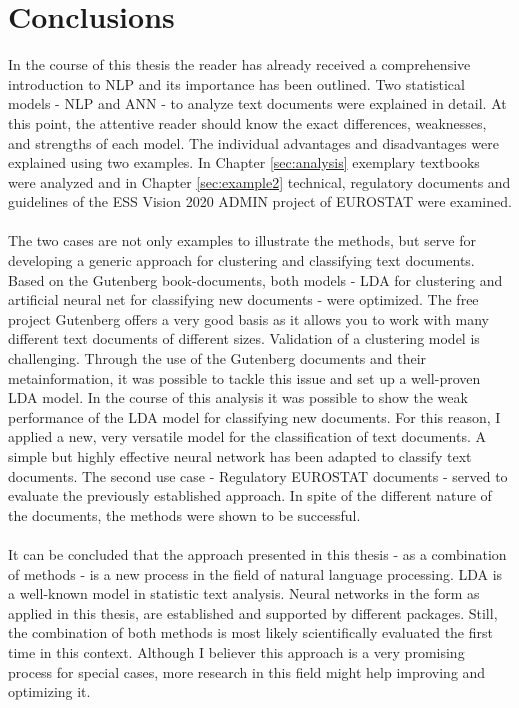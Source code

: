 \documentclass[11pt,a4paper]{article}
\begin{document}
\section{Conclusions} \label{sec:conclusions}

In the course of this thesis the reader has already received a comprehensive introduction to NLP and its importance has been outlined. Two statistical models - NLP and ANN - to analyze text documents were explained in detail. At this point, the attentive reader should know the exact differences, weaknesses, and strengths of each model. The individual advantages and disadvantages were explained using two examples. In Chapter \ref{sec:analysis} exemplary textbooks were analyzed and in Chapter \ref{sec:example2} technical, regulatory documents and guidelines of the ESS Vision 2020 ADMIN project of EUROSTAT were examined.\\
\ \\
The two cases are not only examples to illustrate the methods, but serve for developing a generic approach for clustering and classifying text documents. Based on the Gutenberg book-documents, both models - LDA for clustering and artificial neural net for classifying new documents - were optimized. The free project Gutenberg offers a very good basis as it allows you to work with many different text documents of different sizes. Validation of a clustering model is challenging. Through the use of the Gutenberg documents and their metainformation, it was possible to tackle this issue and set up a well-proven LDA model. In the course of this analysis it was possible to show the weak performance of the LDA model for classifying new documents. For this reason, I applied a new, very versatile model for the classification of text documents. A simple but highly effective neural network has been adapted to classify text documents. The second use case - Regulatory EUROSTAT documents - served to evaluate the previously established approach. In spite of the different nature of the documents, the methods were shown to be successful. \\
\ \\
It can be concluded that the approach presented in this thesis - as a combination of methods - is a new process in the field of natural language processing. LDA is a well-known model in statistic text analysis. Neural networks in the form as applied in this thesis, are established and supported by different packages. Still, the combination of both methods is most likely scientifically evaluated the first time in this context. Although I believer this approach is a very promising process for special cases, more research in this field might help improving and optimizing it.\\
\end{document}
